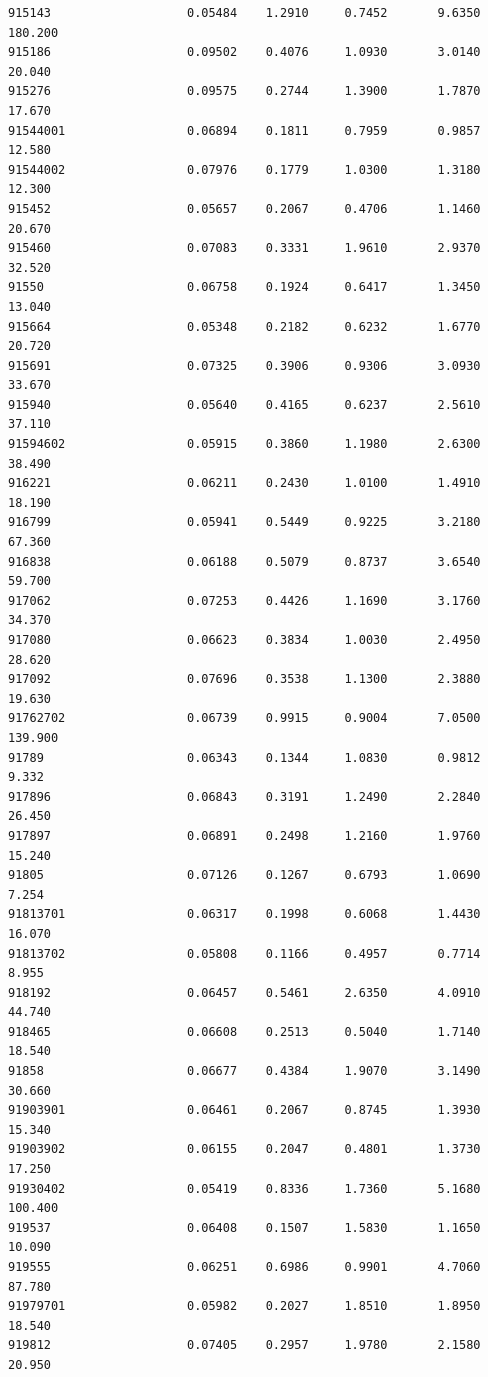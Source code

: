 \documentclass[
  letterpaper,
  DIV=11,
  numbers=noendperiod]{scrartcl}
\begin{document}
\begin{verbatim}
915143                   0.05484    1.2910     0.7452       9.6350 180.200
915186                   0.09502    0.4076     1.0930       3.0140  20.040
915276                   0.09575    0.2744     1.3900       1.7870  17.670
91544001                 0.06894    0.1811     0.7959       0.9857  12.580
91544002                 0.07976    0.1779     1.0300       1.3180  12.300
915452                   0.05657    0.2067     0.4706       1.1460  20.670
915460                   0.07083    0.3331     1.9610       2.9370  32.520
91550                    0.06758    0.1924     0.6417       1.3450  13.040
915664                   0.05348    0.2182     0.6232       1.6770  20.720
915691                   0.07325    0.3906     0.9306       3.0930  33.670
915940                   0.05640    0.4165     0.6237       2.5610  37.110
91594602                 0.05915    0.3860     1.1980       2.6300  38.490
916221                   0.06211    0.2430     1.0100       1.4910  18.190
916799                   0.05941    0.5449     0.9225       3.2180  67.360
916838                   0.06188    0.5079     0.8737       3.6540  59.700
917062                   0.07253    0.4426     1.1690       3.1760  34.370
917080                   0.06623    0.3834     1.0030       2.4950  28.620
917092                   0.07696    0.3538     1.1300       2.3880  19.630
91762702                 0.06739    0.9915     0.9004       7.0500 139.900
91789                    0.06343    0.1344     1.0830       0.9812   9.332
917896                   0.06843    0.3191     1.2490       2.2840  26.450
917897                   0.06891    0.2498     1.2160       1.9760  15.240
91805                    0.07126    0.1267     0.6793       1.0690   7.254
91813701                 0.06317    0.1998     0.6068       1.4430  16.070
91813702                 0.05808    0.1166     0.4957       0.7714   8.955
918192                   0.06457    0.5461     2.6350       4.0910  44.740
918465                   0.06608    0.2513     0.5040       1.7140  18.540
91858                    0.06677    0.4384     1.9070       3.1490  30.660
91903901                 0.06461    0.2067     0.8745       1.3930  15.340
91903902                 0.06155    0.2047     0.4801       1.3730  17.250
91930402                 0.05419    0.8336     1.7360       5.1680 100.400
919537                   0.06408    0.1507     1.5830       1.1650  10.090
919555                   0.06251    0.6986     0.9901       4.7060  87.780
91979701                 0.05982    0.2027     1.8510       1.8950  18.540
919812                   0.07405    0.2957     1.9780       2.1580  20.950

\end{verbatim}
\end{document}
